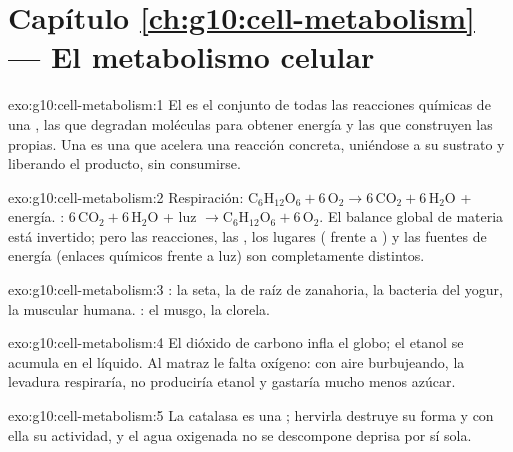 \section*{Capítulo \ref{ch:g10:cell-metabolism} --- El metabolismo celular}

\begin{solution}{exo:g10:cell-metabolism:1}
El  es el conjunto de todas las reacciones químicas de una
, las que degradan moléculas para obtener energía y las que
construyen las propias. Una  es una  que acelera una
reacción concreta, uniéndose a su sustrato y liberando el producto, sin
consumirse.
\end{solution}

\begin{solution}{exo:g10:cell-metabolism:2}
Respiración: $\mathrm{C_6H_{12}O_6} + 6\,\mathrm{O_2} \to
6\,\mathrm{CO_2} + 6\,\mathrm{H_2O}$ + energía. :
$6\,\mathrm{CO_2} + 6\,\mathrm{H_2O}$ + luz $\to \mathrm{C_6H_{12}O_6}
+ 6\,\mathrm{O_2}$. El balance global de materia está invertido; pero
las reacciones, las , los lugares ( frente a
) y las fuentes de energía (enlaces químicos frente a luz)
son completamente distintos.
\end{solution}

\begin{solution}{exo:g10:cell-metabolism:3}
: la seta, la  de raíz de zanahoria, la bacteria del
yogur, la  muscular humana. : el musgo, la clorela.
\end{solution}

\begin{solution}{exo:g10:cell-metabolism:4}
El dióxido de carbono infla el globo; el etanol se acumula en el
líquido. Al matraz le falta oxígeno: con aire burbujeando, la levadura
respiraría, no produciría etanol y gastaría mucho menos azúcar.
\end{solution}

\begin{solution}{exo:g10:cell-metabolism:5}
La catalasa es una ; hervirla destruye su forma y con ella su
actividad, y el agua oxigenada no se descompone deprisa por sí sola.
\end{solution}

